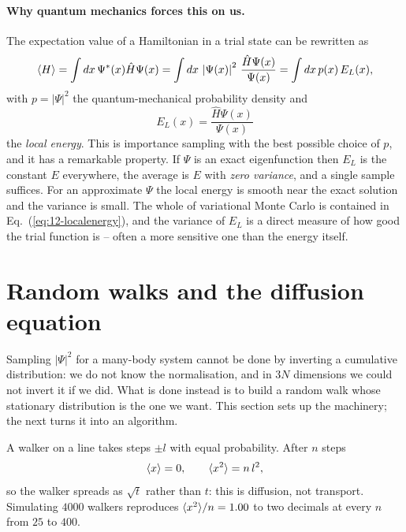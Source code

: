 \paragraph{Why quantum mechanics forces this on us.}
The expectation value of a Hamiltonian in a trial state can be rewritten as
\begin{equation}
  \langle H \rangle
   = \int dx\,\Psi^{*}(x)\hat{H}\Psi(x)
   = \int dx\,\left|\Psi(x)\right|^2\,
     \frac{\hat{H}\Psi(x)}{\Psi(x)}
   = \int dx\,p(x)\,E_L(x),
  \label{eq:12-localenergy}
\end{equation}
with $p=|\Psi|^2$ the quantum-mechanical probability density and
\begin{equation}
  \boxed{\;E_L(x) = \frac{\hat{H}\Psi(x)}{\Psi(x)}\;}
  \label{eq:12-localenergydef}
\end{equation}
the \emph{local energy}.  This is importance sampling with the best possible
choice of $p$, and it has a remarkable property.  If $\Psi$ is an exact
eigenfunction then $E_L$ is the constant $E$ everywhere, the average is $E$
with \emph{zero variance}, and a single sample suffices.  For an approximate
$\Psi$ the local energy is smooth near the exact solution and the variance is
small.  The whole of variational Monte Carlo is contained in
Eq.~(\ref{eq:12-localenergy}), and the variance of $E_L$ is a direct measure
of how good the trial function is -- often a more sensitive one than the
energy itself.

\section{Random walks and the diffusion equation}
\label{sec:randomwalks}

Sampling $|\Psi|^2$ for a many-body system cannot be done by inverting a
cumulative distribution: we do not know the normalisation, and in $3N$
dimensions we could not invert it if we did.  What is done instead is to build
a random walk whose stationary distribution is the one we want.  This section
sets up the machinery; the next turns it into an algorithm.

A walker on a line takes steps $\pm l$ with equal probability.  After $n$
steps
\begin{equation}
  \langle x \rangle = 0,
  \qquad
  \langle x^2 \rangle = n\,l^2 ,
  \label{eq:12-walkmoments}
\end{equation}
so the walker spreads as $\sqrt{t}$ rather than $t$: this is diffusion, not
transport.  Simulating $4000$ walkers reproduces
$\langle x^2 \rangle/n = 1.00$ to two decimals at every $n$ from $25$ to $400$.

